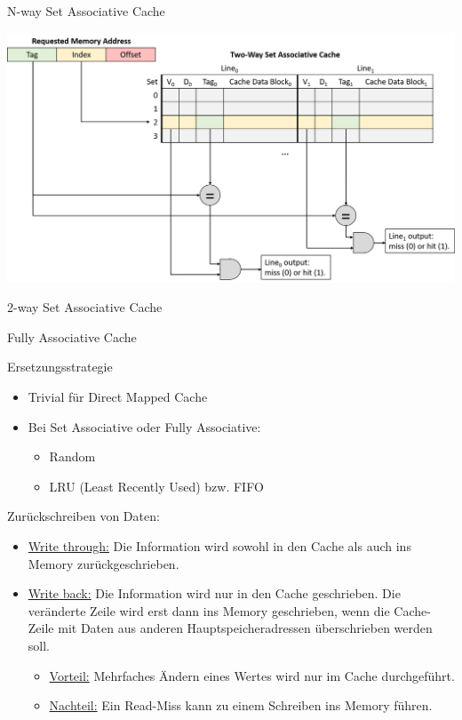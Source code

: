 \begin{defi}{N-way Set Associative Cache}


  \centering
  \includegraphics[width=.9\linewidth]{images/2-way_set_associative_cache_request.png}
\end{defi}

\begin{example}{2-way Set Associative Cache}
\end{example}

\begin{defi}{Fully Associative Cache}

\end{defi}

\begin{defi}{Ersetzungsstrategie}
    \begin{itemize}
        \item Trivial für Direct Mapped Cache
        \item Bei Set Associative oder Fully Associative:
              \begin{itemize}
                  \item Random
                  \item LRU (Least Recently Used) bzw. FIFO
              \end{itemize}
    \end{itemize}
    Zurückschreiben von Daten:
    \begin{itemize}
        \item \underline{Write through:} Die Information wird sowohl in den Cache als auch ins
              Memory zurückgeschrieben.
        \item \underline{Write back:} Die Information wird nur in den Cache geschrieben. Die
              veränderte Zeile wird erst dann ins Memory geschrieben, wenn die
              Cache-Zeile mit Daten aus anderen Hauptspeicheradressen
              überschrieben werden soll.
              \begin{itemize}
                  \item \underline{Vorteil:} Mehrfaches Ändern eines Wertes wird nur im Cache durchgeführt.
                  \item \underline{Nachteil:} Ein Read-Miss kann zu einem Schreiben ins Memory führen.
              \end{itemize}
    \end{itemize}
\end{defi}

